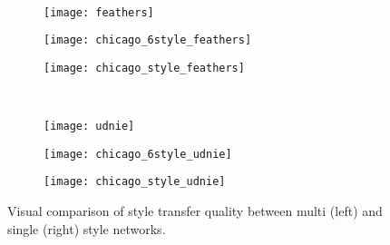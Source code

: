\begin{figure}
\begin{subfigure}[t]{0.4\textwidth}
	\end{subfigure}\\
	\begin{subfigure}[t]{0.1\textwidth}
		\vskip 0pt
		\texttt{[image: feathers]}
	\end{subfigure}
	\begin{subfigure}[t]{0.4\textwidth}
		\vskip 0pt
		\texttt{[image: chicago\_6style\_feathers]}
	\end{subfigure}
	\begin{subfigure}[t]{0.4\textwidth}
		\vskip 0pt
		\texttt{[image: chicago\_style\_feathers]}
	\end{subfigure}\\
	\begin{subfigure}[t]{0.1\textwidth}
		\vskip 0pt
		\texttt{[image: udnie]}
	\end{subfigure}
	\begin{subfigure}[t]{0.4\textwidth}
		\vskip 0pt
		\texttt{[image: chicago\_6style\_udnie]}
	\end{subfigure}
	\begin{subfigure}[t]{0.4\textwidth}
		\vskip 0pt
		\texttt{[image: chicago\_style\_udnie]}
	\end{subfigure}
	\caption{Visual comparison of style transfer quality between multi (left) and single (right) style networks.\label{fig:6v1-style}}
\end{figure}

